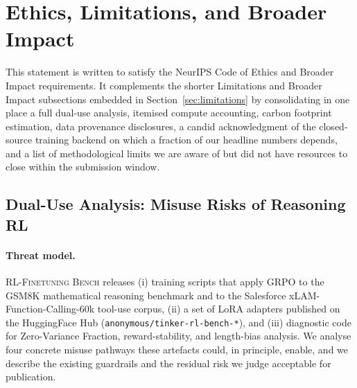 \documentclass{article}
\newcommand{\ours}{\textsc{RL-Finetuning Bench}}
\begin{document}
\label{sec:appendix:ethics}

\section{Ethics, Limitations, and Broader Impact}
\label{sec:impact_standalone}

This statement is written to satisfy the NeurIPS Code of Ethics and Broader
Impact requirements. It complements the shorter Limitations and Broader
Impact subsections embedded in Section~\ref{sec:limitations} by consolidating
in one place a full dual-use analysis, itemised compute accounting, carbon
footprint estimation, data provenance disclosures, a candid acknowledgment
of the closed-source training backend on which a fraction of our headline
numbers depends, and a list of methodological limits we are aware of but
did not have resources to close within the submission window.

\subsection{Dual-Use Analysis: Misuse Risks of Reasoning RL}
\label{sec:dualuse}


\paragraph{Threat model.}
\ours{} releases (i) training scripts that apply GRPO to the GSM8K
\cite{cobbe2021training} mathematical reasoning benchmark and to the
Salesforce xLAM-Function-Calling-60k \cite{liu2024xlam} tool-use corpus,
(ii) a set of LoRA adapters published on the HuggingFace Hub
(\texttt{anonymous/tinker-rl-bench-*}), and (iii) diagnostic code for
Zero-Variance Fraction, reward-stability, and length-bias analysis. We
analyse four concrete misuse pathways these artefacts could, in principle,
enable, and we describe the existing guardrails and the residual risk we
judge acceptable for publication.
\end{document}
